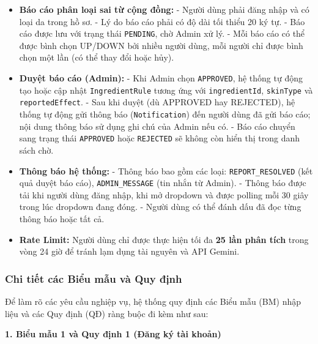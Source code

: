 \documentclass[12pt,a4paper]{article}
\begin{document}
\begin{itemize}
    \item \textbf{Báo cáo phân loại sai từ cộng đồng:}  
    - Người dùng phải đăng nhập và có loại da trong hồ sơ.  
    - Lý do báo cáo phải có độ dài tối thiểu 20 ký tự.  
    - Báo cáo được lưu với trạng thái \texttt{PENDING}, chờ Admin xử lý.  
    - Mỗi báo cáo có thể được bình chọn UP/DOWN bởi nhiều người dùng, mỗi người chỉ được bình chọn một lần (có thể thay đổi hoặc hủy).
    
    \item \textbf{Duyệt báo cáo (Admin):}  
    - Khi Admin chọn \texttt{APPROVED}, hệ thống tự động tạo hoặc cập nhật \texttt{IngredientRule} tương ứng với \texttt{ingredientId}, \texttt{skinType} và \texttt{reportedEffect}.  
    - Sau khi duyệt (dù APPROVED hay REJECTED), hệ thống tự động gửi thông báo (\texttt{Notification}) đến người dùng đã gửi báo cáo; nội dung thông báo sử dụng ghi chú của Admin nếu có.  
    - Báo cáo chuyển sang trạng thái \texttt{APPROVED} hoặc \texttt{REJECTED} sẽ không còn hiển thị trong danh sách chờ.
    
    \item \textbf{Thông báo hệ thống:}  
    - Thông báo bao gồm các loại: \texttt{REPORT\_RESOLVED} (kết quả duyệt báo cáo), \texttt{ADMIN\_MESSAGE} (tin nhắn từ Admin).  
    - Thông báo được tải khi người dùng đăng nhập, khi mở dropdown và được polling mỗi 30 giây trong lúc dropdown đang đóng.  
    - Người dùng có thể đánh dấu đã đọc từng thông báo hoặc tất cả.
    
    \item \textbf{Rate Limit:} Người dùng chỉ được thực hiện tối đa \textbf{25 lần phân tích} trong vòng 24 giờ để tránh lạm dụng tài nguyên và API Gemini.
\end{itemize}





\subsubsection{Chi tiết các Biểu mẫu và Quy định}

Để làm rõ các yêu cầu nghiệp vụ, hệ thống quy định các Biểu mẫu (BM) nhập liệu và các Quy định (QĐ) ràng buộc đi kèm như sau:

\vspace{0.5cm}
\textbf{1. Biểu mẫu 1 và Quy định 1 (Đăng ký tài khoản)}
\end{document}
